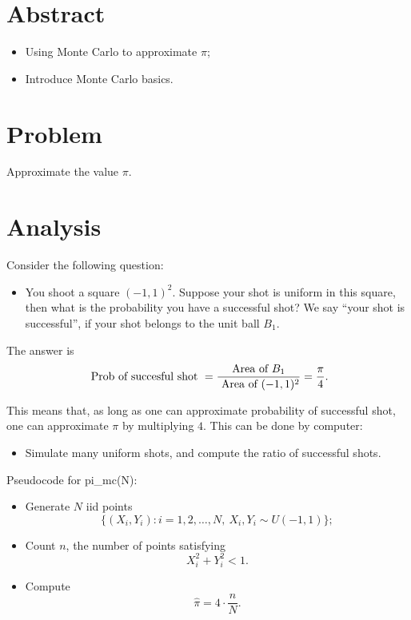 \documentclass{article}
\begin{document}
\section{Abstract}
\begin{itemize}
 \item Using Monte Carlo to approximate $\pi$;
 \item Introduce Monte Carlo basics.
\end{itemize}

\section{Problem}
Approximate the value $\pi$.

\section{Analysis}
Consider the following question:

\begin{itemize}
 \item You shoot a square $(-1, 1)^{2}$. Suppose your shot is uniform in this square, then what is the probability you have a successful shot? We say
 ``your shot is successful'', if your shot belongs to the unit ball $B_{1}$.
\end{itemize}

The answer is 
$$\hbox{ Prob of succesful shot } = \frac{\hbox{Area of  }B_{1}} { \hbox{ Area of }(-1, 1)^{2}} = \frac{\pi}{4} .$$


This means that, as long as one can approximate probability of successful shot, one can approximate $\pi$ by multiplying $4$. This can be done by computer: 
\begin{itemize}
\item Simulate many uniform shots, and compute the ratio of successful shots.
\end{itemize}


Pseudocode for pi\_mc(N):
\begin{itemize}
\item Generate $N$ iid points $$\{(X_i, Y_i): i = 1, 2, \ldots, N, \ X_i, Y_i \sim U(-1,1)\};$$
\item Count $n$, the number of points satisfying
$$X_i^2 + Y_i^2 <1.$$
\item Compute 
$$\hat \pi = 4 \cdot \frac{n}{N}.$$
\end{itemize}
\end{document}
